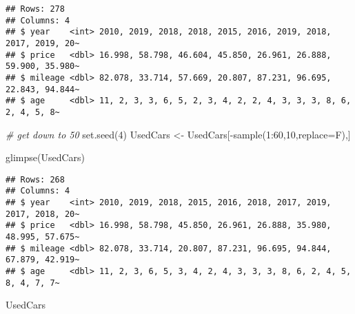 \documentclass[
]{article}
\newenvironment{Shaded}{\begin{snugshade}}{\end{snugshade}}
\newcommand{\AttributeTok}[1]{\textcolor[rgb]{0.77,0.63,0.00}{#1}}
\newcommand{\CommentTok}[1]{\textcolor[rgb]{0.56,0.35,0.01}{\textit{#1}}}
\newcommand{\DecValTok}[1]{\textcolor[rgb]{0.00,0.00,0.81}{#1}}
\newcommand{\FunctionTok}[1]{\textcolor[rgb]{0.00,0.00,0.00}{#1}}
\newcommand{\NormalTok}[1]{#1}
\newcommand{\OtherTok}[1]{\textcolor[rgb]{0.56,0.35,0.01}{#1}}
\newcommand{\SpecialCharTok}[1]{\textcolor[rgb]{0.00,0.00,0.00}{#1}}
\begin{document}
\begin{verbatim}
## Rows: 278
## Columns: 4
## $ year    <int> 2010, 2019, 2018, 2018, 2015, 2016, 2019, 2018, 2017, 2019, 20~
## $ price   <dbl> 16.998, 58.798, 46.604, 45.850, 26.961, 26.888, 59.900, 35.980~
## $ mileage <dbl> 82.078, 33.714, 57.669, 20.807, 87.231, 96.695, 22.843, 94.844~
## $ age     <dbl> 11, 2, 3, 3, 6, 5, 2, 3, 4, 2, 2, 4, 3, 3, 3, 8, 6, 2, 4, 5, 8~
\end{verbatim}

\begin{Shaded}
\begin{Highlighting}[]
\CommentTok{\# get down to 50}
\FunctionTok{set.seed}\NormalTok{(}\DecValTok{4}\NormalTok{)}
\NormalTok{UsedCars }\OtherTok{\textless{}{-}}\NormalTok{ UsedCars[}\SpecialCharTok{{-}}\FunctionTok{sample}\NormalTok{(}\DecValTok{1}\SpecialCharTok{:}\DecValTok{60}\NormalTok{,}\DecValTok{10}\NormalTok{,}\AttributeTok{replace=}\NormalTok{F),]}
\end{Highlighting}
\end{Shaded}

\begin{Shaded}
\begin{Highlighting}[]
\FunctionTok{glimpse}\NormalTok{(UsedCars)}
\end{Highlighting}
\end{Shaded}

\begin{verbatim}
## Rows: 268
## Columns: 4
## $ year    <int> 2010, 2019, 2018, 2015, 2016, 2018, 2017, 2019, 2017, 2018, 20~
## $ price   <dbl> 16.998, 58.798, 45.850, 26.961, 26.888, 35.980, 48.995, 57.675~
## $ mileage <dbl> 82.078, 33.714, 20.807, 87.231, 96.695, 94.844, 67.879, 42.919~
## $ age     <dbl> 11, 2, 3, 6, 5, 3, 4, 2, 4, 3, 3, 3, 8, 6, 2, 4, 5, 8, 4, 7, 7~
\end{verbatim}

\begin{Shaded}
\begin{Highlighting}[]
\NormalTok{UsedCars}
\end{Highlighting}
\end{Shaded}
\end{document}
